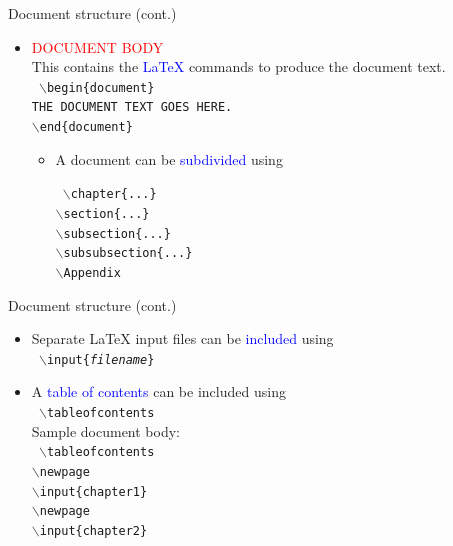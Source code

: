 \documentclass{beamer}
\newcommand{\lx}{{\LaTeX} }
\def\mynormal{\vspace*{-0.5cm}}
\begin{document}
\begin{frame}{Document structure (cont.)}
\mynormal
\medskip
\begin{itemize}
\item \textcolor{red}{DOCUMENT BODY}\\
This contains the \textcolor{blue}{\lx} commands to produce the document 
text.\\
\medskip
{\tt
$\backslash$begin\{document\}             \\
THE DOCUMENT TEXT GOES HERE.\\
$\backslash$end\{document\}\\
}
\medskip
\pause
\begin{itemize}
\item 
A document can be \textcolor{blue}{subdivided} using\\
\medskip

{\tt
$\backslash$chapter\{...\}\\
$\backslash$section\{...\}\\
$\backslash$subsection\{...\}\\
$\backslash$subsubsection\{...\}\\
$\backslash$Appendix
}
\end{itemize}
\end{itemize}
\end{frame}

\begin{frame}{Document structure (cont.)}
\mynormal
\medskip
\begin{itemize}
\item 
Separate \LaTeX \,\,input files can be \textcolor{blue}{included} using\\
\medskip
{\tt
$\backslash$input\{\textit{filename}\}}\\
\medskip
\item 
A \textcolor{blue}{table of contents} can be included using\\
\medskip
{\tt
$\backslash$tableofcontents}\\
\bigskip
\bigskip
Sample document body:\\
\bigskip
{\tt
$\backslash$tableofcontents\\
$\backslash$newpage\\
 $\backslash$input\{chapter1\}\\
$\backslash$newpage\\
 $\backslash$input\{chapter2\}\\
}
\end{itemize}
\end{frame}
\end{document}
